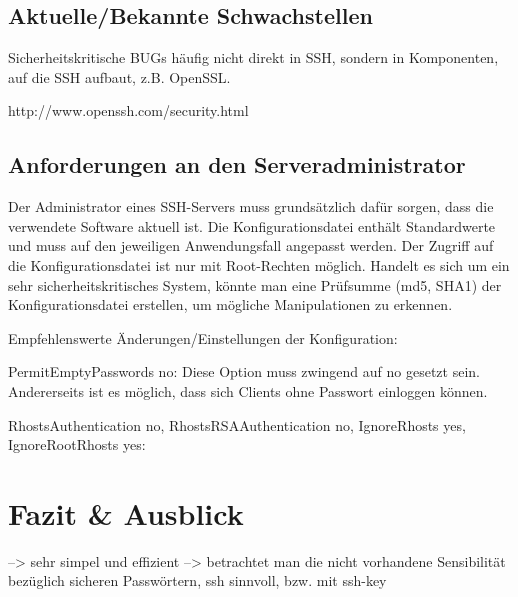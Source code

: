 \documentclass[ngerman,pdf]{wkcms}    %
\begin{document}
\subsection{Aktuelle/Bekannte Schwachstellen}
Sicherheitskritische BUGs häufig nicht direkt in SSH, sondern in Komponenten, auf die SSH aufbaut, z.B. OpenSSL.

http://www.openssh.com/security.html

\subsection{Anforderungen an den Serveradministrator}

Der Administrator eines SSH-Servers muss grundsätzlich dafür sorgen, dass die verwendete Software aktuell ist. Die Konfigurationsdatei enthält Standardwerte und muss auf den jeweiligen Anwendungsfall angepasst werden.
Der Zugriff auf die Konfigurationsdatei ist nur mit Root-Rechten möglich.
Handelt es sich um ein sehr sicherheitskritisches System, könnte man eine Prüfsumme (md5, SHA1) der Konfigurationsdatei erstellen, um mögliche Manipulationen zu erkennen. \cite[S. 50]{openssh_book}

Empfehlenswerte Änderungen/Einstellungen der Konfiguration:

\IT PermitEmptyPasswords no: Diese Option muss zwingend auf \IT no gesetzt sein. Andererseits ist es möglich, dass sich Clients ohne Passwort einloggen können.

\IT RhostsAuthentication no, RhostsRSAAuthentication no, IgnoreRhosts yes, IgnoreRootRhosts yes: 








\newpage


\section{Fazit \& Ausblick}
--> sehr simpel und effizient
--> betrachtet man die nicht vorhandene Sensibilität bezüglich sicheren Passwörtern, ssh sinnvoll, bzw. mit ssh-key




%
\end{document}
